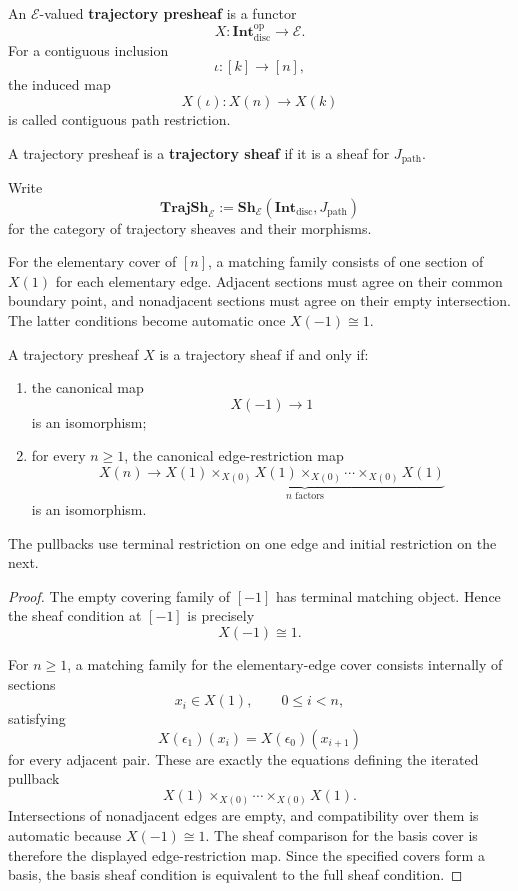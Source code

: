 \begin{definition}
\label{def:internal-trajectory-presheaf}
An \(\mathcal E\)-valued \textbf{trajectory presheaf} is a functor
\[
    X:
    \mathbf{Int}_{\mathrm{disc}}^{\mathrm{op}}
    \to
    \mathcal E.
\]
For a contiguous inclusion
\[
    \iota:[k]\to[n],
\]
the induced map
\[
    X(\iota):X(n)\to X(k)
\]
is called contiguous path restriction.
\end{definition}

\begin{definition}
\label{def:discrete-trajectory-sheaf}
A trajectory presheaf is a \textbf{trajectory sheaf} if it is a sheaf for
\(J_{\mathrm{path}}\).
\end{definition}

Write
\[
    \mathbf{TrajSh}_{\mathcal E}
    :=
    \mathbf{Sh}_{\mathcal E}
    \left(
        \mathbf{Int}_{\mathrm{disc}},
        J_{\mathrm{path}}
    \right)
\]
for the category of trajectory sheaves and their morphisms.

For the elementary cover of \([n]\), a matching family consists of one
section of \(X(1)\) for each elementary edge. Adjacent sections must agree on
their common boundary point, and nonadjacent sections must agree on their
empty intersection. The latter conditions become automatic once
\(X(-1)\cong1\).

\begin{proposition}
\label{prop:concrete-trajectory-sheaf-condition}
A trajectory presheaf \(X\) is a trajectory sheaf if and only if:
\begin{enumerate}
    \item the canonical map
    \[
        X(-1)\longrightarrow1
    \]
    is an isomorphism;
    \item for every \(n\geq1\), the canonical edge-restriction map
    \[
        X(n)
        \longrightarrow
        \underbrace{
        X(1)\times_{X(0)}
        X(1)\times_{X(0)}
        \cdots\times_{X(0)}X(1)
        }_{n\text{ factors}}
    \]
    is an isomorphism.
\end{enumerate}
The pullbacks use terminal restriction on one edge and initial restriction on
the next.
\end{proposition}

\begin{proof}
The empty covering family of \([-1]\) has terminal matching object. Hence the
sheaf condition at \([-1]\) is precisely
\[
    X(-1)\cong1.
\]

For \(n\geq1\), a matching family for the elementary-edge cover consists
internally of sections
\[
    x_i\in X(1),
    \qquad
    0\leq i<n,
\]
satisfying
\[
    X(\epsilon_1)(x_i)
    =
    X(\epsilon_0)(x_{i+1})
\]
for every adjacent pair. These are exactly the equations defining the
iterated pullback
\[
    X(1)\times_{X(0)}\cdots\times_{X(0)}X(1).
\]
Intersections of nonadjacent edges are empty, and compatibility over them is
automatic because \(X(-1)\cong1\). The sheaf comparison for the basis cover
is therefore the displayed edge-restriction map. Since the specified covers
form a basis, the basis sheaf condition is equivalent to the full sheaf
condition.
\end{proof}


